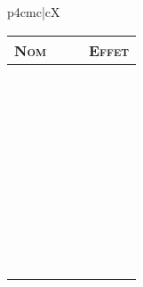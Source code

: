 \documentclass[11pt]{article} %
\newcommand{\scbf}[1]{\textsc{\textbf{#1}}}
\begin{document}
\begin{tabularx}{\linewidth}{p{4cm}c|cX}
\end{tabularx}

\newpage
\noindent
\begin{tabularx}{\linewidth}{p{4cm}c|cX}
\hline

    \scbf{Nom} &&& \scbf{Effet}\\\hline

    &&&\\ &&&\\\cline{1-1}\cline{4-4}
    &&&\\ &&&\\\cline{4-4}
    &&&\\ &&&\\\cline{1-1}\cline{4-4}
    &&&\\ &&&\\\cline{4-4}
    &&&\\ &&&\\\cline{1-1}\cline{4-4}
    &&&\\ &&&\\\cline{4-4}
    &&&\\ &&&\\\cline{1-1}\cline{4-4}
    &&&\\ &&&\\\cline{4-4}
    &&&\\ &&&\\\cline{1-1}\cline{4-4}
    &&&\\ &&&\\\cline{4-4}
    &&&\\ &&&\\\cline{1-1}\cline{4-4}
    &&&\\ &&&\\\cline{4-4}
    &&&\\ &&&\\\cline{1-1}\cline{4-4}
    &&&\\ &&&\\\cline{4-4}
    &&&\\ &&&\\\cline{1-1}\cline{4-4}
    &&&\\ &&&\\\cline{4-4}
    &&&\\ &&&\\\cline{1-1}\cline{4-4}
    &&&\\ &&&\\\cline{4-4}
    &&&\\ &&&\\\cline{1-1}\cline{4-4}
    &&&\\ &&&\\\cline{4-4}

\end{tabularx}
\end{document}
